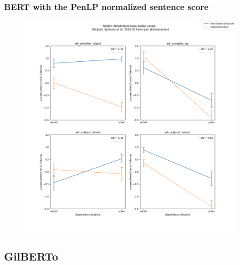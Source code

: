 \subsubsection{BERT with the PenLP normalized sentence score}
\begin{figure}[h]
	\centering
	\includegraphics[width=1\textwidth]{images/AppendixA/Sprouse_wh_dbmdz_bert-base-italian-cased_PenLP-zscores-likert-2022-09-17_h11m04s22.png} 
	\label{A-fig:sprouse_bert2b_penlp}
	\caption{}
\end{figure}



\clearpage
\subsection{GilBERTo}

